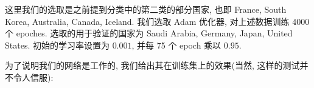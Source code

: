 \documentclass[UTF8]{ctexart}
\begin{document}
	这里我们的选取是之前提到分类中的第二类的部分国家, 也即 France, South Korea, Australia, Canada, Iceland. 我们选取 Adam 优化器, 对上述数据训练 4000 个 epoches. 选取的用于验证的国家为 Saudi Arabia, Germany, Japan, United States. 初始的学习率设置为 $0.001$, 并每 75 个 epoch 乘以 $0.95$.

	为了说明我们的网络是工作的, 我们给出其在训练集上的效果(当然, 这样的测试并不令人信服):
	\begin{figure}[htbp]
	    \centering
	\end{figure}
\end{document}
